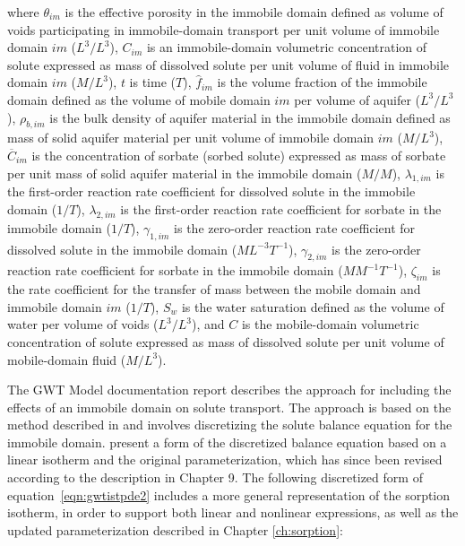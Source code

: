 \noindent where 
$\theta_{im}$ is the effective porosity in the immobile domain defined as volume of voids participating in immobile-domain transport per unit volume of immobile domain $im$ ($L^3/L^3$),
$C_{im}$ is an immobile-domain volumetric concentration of solute expressed as mass of dissolved solute per unit volume of fluid in immobile domain $im$ ($M/L^3$),
$t$ is time ($T$),
$\hat{f}_{im}$ is the volume fraction of the immobile domain defined as the volume of mobile domain $im$ per volume of aquifer ($L^3/L^3$),
$\rho_{b,im}$ is the bulk density of aquifer material in the immobile domain defined as mass of solid aquifer material per unit volume of immobile domain $im$ ($M/L^3$), 
$\overline{C}_{im}$ is the concentration of sorbate (sorbed solute) expressed as mass of sorbate per unit mass of solid aquifer material in the immobile domain ($M/M$), 
$\lambda_{1,im}$ is the first-order reaction rate coefficient for dissolved solute in the immobile domain ($1/T$), 
$\lambda_{2,im}$ is the first-order reaction rate coefficient for sorbate in the immobile domain ($1/T$), 
$\gamma_{1,im}$ is the zero-order reaction rate coefficient for dissolved solute in the immobile domain ($ML^{-3}T^{-1}$), 
$\gamma_{2,im}$ is the zero-order reaction rate coefficient for sorbate in the immobile domain ($M M^{-1}T^{-1}$), 
$\zeta_{im}$ is the rate coefficient for the transfer of mass between the mobile domain and immobile domain $im$ ($1/T$),
$S_w$ is the water saturation defined as the volume of water per volume of voids ($L^3/L^3$), 
and $C$ is the mobile-domain volumetric concentration of solute expressed as mass of dissolved solute per unit volume of mobile-domain fluid ($M/L^3$).

The GWT Model documentation report \citep{modflow6gwt} describes the approach for including the effects of an immobile domain on solute transport.   The approach is based on the method described in \cite{zheng2002} and involves discretizing the solute balance equation for the immobile domain.  \cite{modflow6gwt} present a form of the discretized balance equation based on a linear isotherm and the original parameterization, which has since been revised according to the description in Chapter 9.  The following discretized form of equation~\ref{eqn:gwtistpde2} includes a more general representation of the sorption isotherm, in order to support both linear and nonlinear expressions, as well as the updated parameterization described in Chapter \ref{ch:sorption}:

